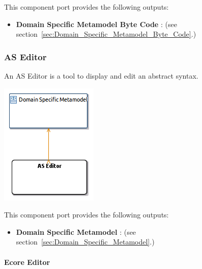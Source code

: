\documentclass{gemoc} %
\begin{document}
This component port provides the following outputs:
\begin{itemize}
  \item \textbf{Domain Specific Metamodel Byte Code} :
(see section~\ref{sec:Domain_Specific_Metamodel_Byte_Code}.)
\end{itemize}


\subsubsection{AS Editor}
\label{sec:AS_Editor}

An AS Editor is a tool to display and edit an abstract syntax.
\begin{center}
\includegraphics*[trim=0.0cm 0.0cm 0cm 0.0cm, clip=true]{../images/generated/Generated_AS_Editor.png}
\end{center}


This component port provides the following outputs:
\begin{itemize}
  \item \textbf{Domain Specific Metamodel} :
(see section~\ref{sec:Domain_Specific_Metamodel}.)
\end{itemize}

\paragraph{Ecore Editor}
\label{sec:Ecore_Editor}
\end{document}
